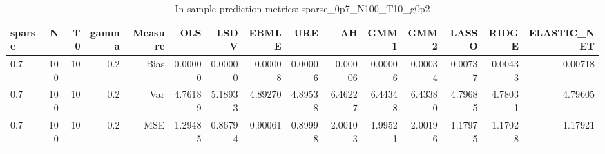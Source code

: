 \begin{table}[!htbp]\centering
\caption{In-sample prediction metrics: sparse_0p7_N100_T10_g0p2}
\label{tab:table2_sparse_0p7_N100_T10_g0p2}
\begin{tabular}{lrrrrrrrrrrrrrr}
\hline
sparse & N & T0 & gamma & Measure & OLS & LSDV & EBMLE & URE & AH & GMM1 & GMM2 & LASSO & RIDGE & ELASTIC_NET \\
\hline
0.7 & 100 & 10 & 0.2 & Bias & 0.00000 & 0.00000 & -0.00008 & 0.00006 & -0.00006 & 0.00006 & 0.00034 & 0.00737 & 0.00433 & 0.00718 \\
0.7 & 100 & 10 & 0.2 & Var & 4.76189 & 5.18933 & 4.89270 & 4.89538 & 6.46227 & 6.44348 & 6.43380 & 4.79685 & 4.78031 & 4.79605 \\
0.7 & 100 & 10 & 0.2 & MSE & 1.29485 & 0.86794 & 0.90061 & 0.89998 & 2.00103 & 1.99521 & 2.00196 & 1.17975 & 1.17028 & 1.17921 \\
\hline
\end{tabular}
\end{table}


